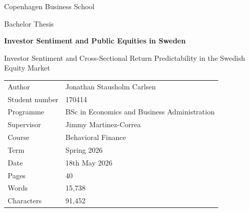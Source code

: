 \documentclass[11pt]{article}
\newcommand{\thesistitle}{Investor Sentiment and Public Equities in Sweden}
\newcommand{\thesistype}{Bachelor Thesis}
\newcommand{\thesisprogramme}{BSc in Economics and Business Administration}
\newcommand{\thesiscourse}{Behavioral Finance}
\newcommand{\thesisterm}{Spring 2026}
\newcommand{\wordcount}{15,738}
\newcommand{\charactercount}{91,452}
\newcommand{\supervisor}{Jimmy Martinez-Correa}
\newcommand{\thesisauthor}{Jonathan Stausholm Carlsen}
\newcommand{\thesisstudentnumber}{170414}
\newcommand{\thesisuniversity}{Copenhagen Business School}
\newcommand{\thesisdate}{18th May 2026}
\begin{document}
\hypersetup{pageanchor=false}
\begin{titlepage}
    \centering
    \vspace*{1.5cm}

    {\Large \thesisuniversity\par}
    \vspace{0.25cm}
    {\large \thesistype\par}

    \vspace{2.0cm}

    {\huge\bfseries \thesistitle\par}
    \vspace{0.4cm}
    {\large Investor Sentiment and Cross-Sectional Return Predictability in the Swedish Equity Market\par}

    \vspace{2.0cm}

    \begin{tabular}{@{}ll@{}}
        \toprule
        Author & \thesisauthor \\
        Student number & \thesisstudentnumber \\
        Programme & \thesisprogramme \\
        Supervisor & \supervisor \\
        Course & \thesiscourse \\
        Term & \thesisterm \\
        Date & \thesisdate \\
        \midrule
        Pages & 40 \\
        Words & \wordcount\\
        Characters & \charactercount \\
    \end{tabular}

    \vfill
\end{titlepage}

\hypersetup{pageanchor=true}

\tableofcontents
\clearpage

\newpage
\clearpage
\thispagestyle{plain}
\vspace*{2.5cm}

\vspace{0.8cm}
\end{document}
